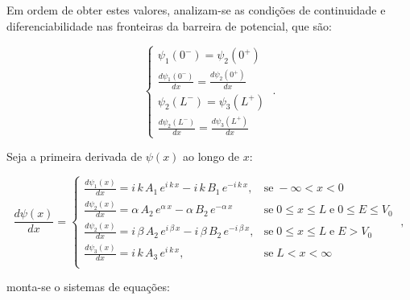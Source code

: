 Em ordem de obter estes valores, analizam-se as condições de continuidade
e diferenciabilidade nas fronteiras da barreira de potencial, que são:

\begin{equation}
	\begin{cases}
		\psi_{1}(0^-) = \psi_{2}(0^+)                         \\
		\frac{d\psi_{1}(0^-)}{dx} = \frac{d\psi_{2}(0^+)}{dx} \\
		\psi_{2}(L^-) = \psi_{3}(L^+)                         \\
		\frac{d\psi_{2}(L^-)}{dx} = \frac{d\psi_{3}(L^+)}{dx}
	\end{cases}\;.
\end{equation}

Seja a primeira derivada de $\psi(x)$ ao longo de $x$:

\begin{equation}
	\frac{d\psi(x)}{dx}=
	\begin{cases}

		\frac{d\psi_{1}(x)}{dx} = i\,k\,A_1\,e^{i\,k\,x}
		- i\,k\,B_1\,e^{-i\,k\,x},                        &
		\mbox{se}\; -\infty<x<0                               \\

		\frac{d\psi_{2}(x)}{dx} = \alpha\,A_2\,e^{\alpha\,x}
		- \alpha\,B_2\,e^{-\alpha\,x}                     &
		\mbox{se}\; 0 \le x \le L \;\mbox{e}\;0 \le E \le V_0 \\

		\frac{d\psi_{2}(x)}{dx} = i\,\beta\,A_2\,e^{i\,\beta\,x}
		- i\,\beta\,B_2\,e^{-i\,\beta\,x},                &
		\mbox{se}\; 0 \le x \le L \;\mbox{e}\; E > V_0        \\

		\frac{d\psi_{3}(x)}{dx} = i\,k\,A_3\,e^{i\,k\,x}, &
		\mbox{se}\; L<x<\infty                                \\
	\end{cases}\;,
\end{equation}

monta-se o sistemas de equações:

